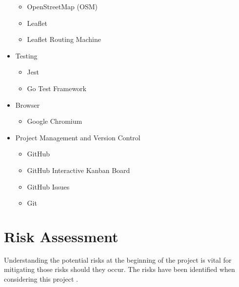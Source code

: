 \begin{itemize}
\begin{itemize}
        \item OpenStreetMap (OSM)
        \item Leaflet
        \item Leaflet Routing Machine
    \end{itemize}
    \item Testing
    \begin{itemize}
        \item Jest
        \item Go Test Framework
    \end{itemize}
    \item Browser
    \begin{itemize}
        \item Google Chromium
    \end{itemize}
    \item Project Management and Version Control
    \begin{itemize}
        \item GitHub
        \item GitHub Interactive Kanban Board
        \item GitHub Issues
        \item Git
    \end{itemize}
\end{itemize}

\section{Risk Assessment}
\label{intro:riskassessment}

Understanding the potential risks at the beginning of the project is vital for mitigating those risks should they occur. The risks have been identified when considering this project .

